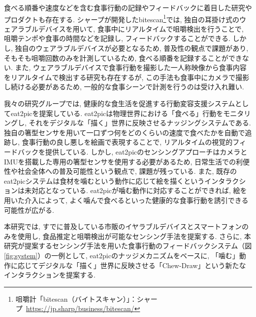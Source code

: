 食べる順番や速度などを含む食事行動の記録やフィードバックに着目した研究やプロダクトも存在する. シャープが開発したbitescan\footnote{咀嚼計「bitescan（バイトスキャン）」：シャープ~\url{https://jp.sharp/business/bitescan/}}では, 独自の耳掛け式のウェアラブルデバイスを用いて, 食事中にリアルタイムで咀嚼検出を行うことで, 咀嚼テンポや食事の時間などを記録し, フィードバックすることができる. しかし, 独自のウェアラブルデバイスが必要となるため, 普及性の観点で課題があり, そもそも咀嚼回数のみを計測しているため, 食べる順番を記録することができない. また, ウェアラブルデバイスで食事行動を撮影した一人称映像から食事内容をリアルタイムで検出する研究も存在するが, この手法も食事中にカメラで撮影し続ける必要があるため, 一般的な食事シーンで計測を行うのは受け入れ難い\cite{10.1145/3551626.3564964}.

我々の研究グループでは, 健康的な食生活を促進する行動変容支援システムとしてeat2picを提案している\cite{10.1145/3580784}. eat2picは物理世界における「食べる」行動をモニタリングし, それをデジタルな「描く」世界に反映させるナッジングシステムである. 独自の箸型センサを用いて一口ずつ何をどのくらいの速度で食べたかを自動で追跡し, 食事行動の良し悪しを絵画で表現することで, リアルタイムの視覚的フィードバックを提供している. しかし, eat2picのセンシングアプローチはカメラとIMUを搭載した専用の箸型センサを使用する必要があるため, 日常生活での利便性や社会全体への普及可能性という観点で, 課題が残っている. また, 既存のeat2picシステムは食材を噛むという動作に応じて絵を描くというインタラクションは未対応となっている. eat2picが噛む動作に対応することができれば, 絵を用いた介入によって, よく噛んで食べるといった健康的な食事行動を誘引できる可能性が広がる.

本研究では, すでに普及している市販のイヤラブルデバイスとスマートフォンのみを使用し, 食品推定と咀嚼検出が可能なセンシング手法を提案する. さらに, 本研究が提案するセンシング手法を用いた食事行動のフィードバックシステム（図\ref{fig:system}）の一例として, eat2picのナッジメカニズムをベースに, 「噛む」動作に応じてデジタルな「描く」世界に反映させる「Chew-Draw」という新たなインタラクションを提案する.

